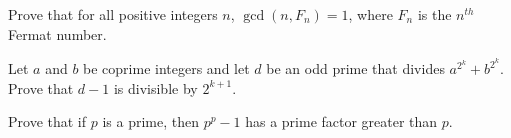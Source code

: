 \documentclass{subfile}
\begin{document}
	\begin{problem}
		Prove that for all positive integers $n$, $\gcd(n, F_n) = 1$, where $F_n$ is the $n^{th}$ Fermat number. %
	\end{problem}


	\begin{problem}
		Let $a$ and $b$ be coprime integers and let $d$ be an odd prime that divides $a^{2^{k}}+b^{2^{k}}$. Prove that $d-1$ is divisible by $2^{k+1}$. %
	\end{problem}


	\begin{problem}
		Prove that if $p$ is a prime, then $p^p-1$ has a prime factor greater than $p$. %
	\end{problem}

\end{document}
